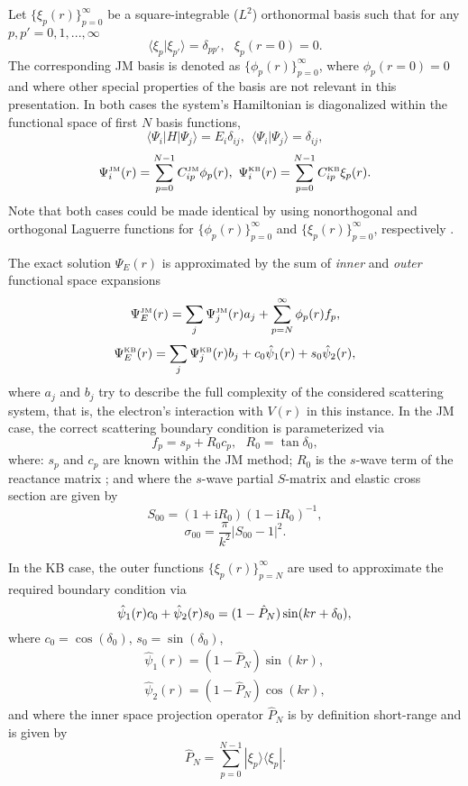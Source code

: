 \documentclass[aip
, pra
, showpacs
, aps
, twocolumn
, groupedaddress
, floatfix
]{revtex4}
\newcommand{\beq}{\begin{equation}}
\newcommand{\eeq}{\end{equation}}
\newcommand{\barr}{\begin{array}}
\newcommand{\earr}{\end{array}}
\newcommand{\JM}{\mbox{\tiny{JM}}}
\newcommand{\KB}{\mbox{\tiny{KB}}}
\begin{document}
Let $\{\xi_p(r)\}_{p=0}^\infty$ be a square-integrable ($L^2$) orthonormal basis
such that
for any $p,p'=0,1,...,\infty$
\beq
\langle \xi_p | \xi_{p'} \rangle=\delta_{pp'}, \ \ \ \xi_p(r=0)=0.
\eeq
The corresponding JM basis is denoted as $\{\phi_p(r)\}_{p=0}^\infty$, where $\phi_p(r=0)=0$
and where other special properties of the basis are not relevant in this presentation.
In both cases the system's Hamiltonian is diagonalized within the functional space of first $N$ basis functions,
\beq
\langle \Psi_i |H| \Psi_j \rangle = E_i \delta_{ij} , \ \ \langle \Psi_i | \Psi_j \rangle=\delta_{ij},
\eeq
\beq
\Psi_i^{\JM}(r) = \sum_{p=0}^{N-1} C_{ip}^{\JM} \phi_p(r), \
\Psi_i^{\KB}(r) = \sum_{p=0}^{N-1} C_{ip}^{\KB} \xi_p(r).
\eeq
Note that both cases could be made identical by using nonorthogonal and orthogonal Laguerre functions for
$\{\phi_p(r)\}_{p=0}^\infty$ and $\{\xi_p(r)\}_{p=0}^\infty$, respectively \cite{KB10p022708}.


The exact solution $\Psi_E(r)$ is approximated by the sum of {\em inner} and {\em outer} functional space expansions
\beq
\Psi_E^{\JM}(r) =\sum_j \Psi_j^{\JM}(r)a_j  + \sum_{p=N}^{\infty} \phi_p(r) f_p,  \label{Psi_JM}
\eeq
\beq
\Psi_E^{\KB}(r) =\sum_j \Psi_j^{\KB}(r) b_j  + c_0 \hat{\psi}_1(r)  + s_0 \hat{\psi}_2(r), \label{Psi_KB}
\eeq
where $a_j$ and $b_j$ try to describe the full complexity of the considered scattering system, that is,
the electron's interaction with  $V(r)$ in this instance.
In the JM case, the correct scattering boundary condition is parameterized via
\beq
f_p = s_p + R_0 c_p, \ \ \ R_0 = \tan \delta_0,  \label{R_0}
\eeq
where: $s_p$ and $c_p$  are known within the JM method;
$R_0$ is the $s$-wave term of the reactance matrix \cite{Taylor72};
and where the $s$-wave partial $S$-matrix and elastic cross section are given by
\beq
S_{00}=(1+\mbox{i}R_0)(1-\mbox{i}R_0)^{-1},
\eeq
\beq
\sigma_{00}=\frac{\pi}{k^2} |S_{00}-1|^2.
\eeq


In the KB case, the outer functions $\{\xi_p(r)\}_{p=N}^\infty$ are used to approximate the required boundary condition via
\beq
\hat{\psi}_1(r) c_0 + \hat{\psi}_2(r) s_0 =
(1-\hat{P}_N) \sin(kr + \delta_0),\\
\eeq
where $c_0 = \cos(\delta_0)$, $s_0 = \sin(\delta_0)$,
\beq \barr{l}
\hat{\psi}_1(r) = (1-\hat{P}_N) \sin(kr),\\
\hat{\psi}_2(r) = (1-\hat{P}_N) \cos(kr),
\earr \eeq
and where the inner space projection operator $\hat{P}_N$ is by definition short-range and is given by \\
\beq
\hat{P}_N = \sum_{p=0}^{N-1} | \xi_p \rangle \langle \xi_p |.
\eeq
\end{document}
